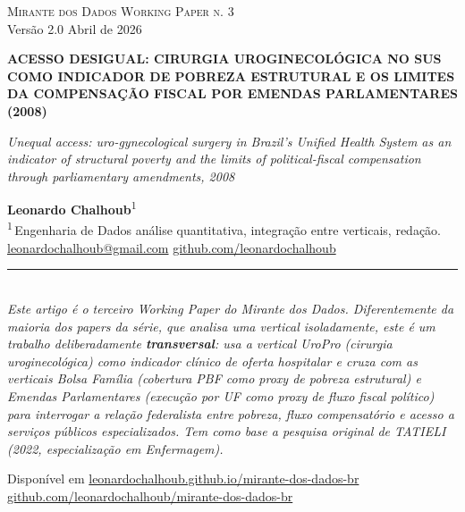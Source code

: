 \documentclass[12pt,a4paper,oneside]{article}
\begin{document}
\begin{titlepage}
  \begin{center}
    \vspace*{1.5cm}
    {\small\textsc{Mirante dos Dados \quad\textbar\quad Working Paper n. 3}}\\
    {\small Versão 2.0 \textemdash{} Abril de 2026}

    \vfill

    {\LARGE\bfseries
     ACESSO DESIGUAL:
     CIRURGIA UROGINECOLÓGICA NO SUS
     COMO INDICADOR DE POBREZA ESTRUTURAL
     E OS LIMITES DA COMPENSAÇÃO FISCAL
     POR EMENDAS PARLAMENTARES
     (2008)}

    \vspace{1cm}
    {\large\itshape
     Unequal access: uro-gynecological surgery in Brazil's Unified
     Health System as an indicator of structural poverty and the
     limits of political-fiscal compensation through parliamentary
     amendments, 2008}

    \vfill

    {\large\textbf{Leonardo Chalhoub}\textsuperscript{1}}\\[6pt]
    {\small\textsuperscript{1}\,Engenharia de Dados \textemdash{}
     análise quantitativa, integração entre verticais, redação.}\\[6pt]
    {\small\href{mailto:leonardochalhoub@gmail.com}{leonardochalhoub@gmail.com}
     \quad\textbullet\quad
     \href{https://github.com/leonardochalhoub}{github.com/leonardochalhoub}}

    \vfill

    \rule{0.6\linewidth}{0.4pt}\\[6pt]
    {\small\textit{Este artigo é o terceiro Working Paper do Mirante dos
     Dados. Diferentemente da maioria dos papers da série, que
     analisa uma vertical isoladamente, este é um trabalho
     deliberadamente \textbf{transversal}: usa a vertical UroPro
     (cirurgia uroginecológica) como indicador clínico de oferta
     hospitalar e cruza com as verticais Bolsa Família (cobertura
     PBF como proxy de pobreza estrutural) e Emendas Parlamentares
     (execução por UF como proxy de fluxo fiscal político) para
     interrogar a relação federalista entre pobreza, fluxo
     compensatório e acesso a serviços públicos especializados.
     Tem como base a pesquisa original de TATIELI (2022,
     especialização em Enfermagem).}}

    \vspace{1cm}
    {\footnotesize
     Disponível em
     \href{https://leonardochalhoub.github.io/mirante-dos-dados-br/}%
     {leonardochalhoub.github.io/mirante-dos-dados-br}}\\[2pt]
    {\footnotesize
     \href{https://github.com/leonardochalhoub/mirante-dos-dados-br}%
     {github.com/leonardochalhoub/mirante-dos-dados-br}}
  \end{center}
\end{titlepage}
\end{document}
